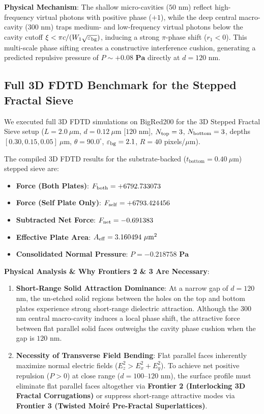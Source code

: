 \documentclass[12pt,letterpaper]{article}
\begin{document}
\textbf{Physical Mechanism}: The shallow micro-cavities ($50$ nm) reflect high-frequency virtual photons with positive phase ($+1$), while the deep central macro-cavity ($300$ nm) traps medium- and low-frequency virtual photons below the cavity cutoff $\xi < \pi c / (W_1 \sqrt{\varepsilon_{\rm bg}})$, inducing a strong $\pi$-phase shift ($r_1 < 0$). This multi-scale phase sifting creates a constructive interference cushion, generating a predicted repulsive pressure of $P \sim \mathbf{+0.08\text{ Pa}}$ directly at $d = 120$ nm.

\subsection{Full 3D FDTD Benchmark for the Stepped Fractal Sieve}
We executed full 3D FDTD simulations on BigRed200 for the 3D Stepped Fractal Sieve setup ($L = 2.0\ \mu\text{m}$, $d = 0.12\ \mu\text{m}$ [$120$ nm], $N_{\rm top} = 3$, $N_{\rm bottom} = 3$, depths $[0.30, 0.15, 0.05]\ \mu\text{m}$, $\theta = 90.0^\circ$, $\varepsilon_{\rm bg} = 2.1$, $R = 40$ pixels/$\mu\text{m}$).

The compiled 3D FDTD results for the substrate-backed ($t_{\text{bottom}} = 0.40\ \mu\text{m}$) stepped sieve are:
\begin{itemize}
    \item \textbf{Force (Both Plates)}: $F_{\rm both} = +6792.733073$
    \item \textbf{Force (Self Plate Only)}: $F_{\rm self} = +6793.424456$
    \item \textbf{Subtracted Net Force}: $F_{\rm net} = -0.691383$
    \item \textbf{Effective Plate Area}: $A_{\rm eff} = 3.160494\ \mu\text{m}^2$
    \item \textbf{Consolidated Normal Pressure}: $P = \mathbf{-0.218758\text{ Pa}}$
\end{itemize}

\textbf{Physical Analysis \& Why Frontiers 2 \& 3 Are Necessary}:
\begin{enumerate}
    \item \textbf{Short-Range Solid Attraction Dominance}: At a narrow gap of $d = 120$ nm, the un-etched solid regions between the holes on the top and bottom plates experience strong short-range dielectric attraction. Although the 300 nm central macro-cavity induces a local phase shift, the attractive force between flat parallel solid faces outweighs the cavity phase cushion when the gap is $120$ nm.
    \item \textbf{Necessity of Transverse Field Bending}: Flat parallel faces inherently maximize normal electric fields ($E_z^2 > E_x^2 + E_y^2$). To achieve net positive repulsion ($P > 0$) at close range ($d = 100\text{--}120$ nm), the surface profile must eliminate flat parallel faces altogether via \textbf{Frontier 2 (Interlocking 3D Fractal Corrugations)} or suppress short-range attractive modes via \textbf{Frontier 3 (Twisted Moir\'e Pre-Fractal Superlattices)}.
\end{enumerate}
\end{document}
